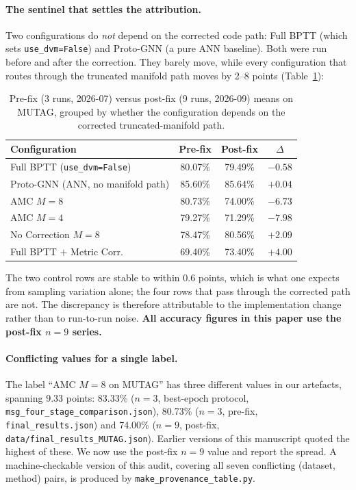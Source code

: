 \documentclass[a4paper,fleqn]{cas-dc}
\begin{document}
\paragraph{The sentinel that settles the attribution.}
Two configurations do \emph{not} depend on the corrected code path:
Full BPTT (which sets \texttt{use\_dvm=False}) and Proto-GNN (a pure ANN
baseline). Both were run before and after the correction. They barely
move, while every configuration that routes through the truncated
manifold path moves by 2--8 points (Table~\ref{tab:sentinel}):

\begin{table}[htbp]
\centering\footnotesize
\caption{Pre-fix (3 runs, 2026-07) versus post-fix (9 runs, 2026-09)
means on MUTAG, grouped by whether the configuration depends on the
corrected truncated-manifold path.}
\label{tab:sentinel}
\begin{tabular}{@{}p{3.3cm}ccc@{}}
\toprule
Configuration & Pre-fix & Post-fix & $\Delta$ \\
\midrule
Full BPTT (\texttt{use\_dvm=False}) & 80.07\% & 79.49\% & $-0.58$ \\
Proto-GNN (ANN, no manifold path) & 85.60\% & 85.64\% & $+0.04$ \\
\midrule
AMC $M{=}8$ & 80.73\% & 74.00\% & $-6.73$ \\
AMC $M{=}4$ & 79.27\% & 71.29\% & $-7.98$ \\
No Correction $M{=}8$ & 78.47\% & 80.56\% & $+2.09$ \\
Full BPTT $+$ Metric Corr. & 69.40\% & 73.40\% & $+4.00$ \\
\bottomrule
\end{tabular}
\end{table}

The two control rows are stable to within 0.6 points, which is what one
expects from sampling variation alone; the four rows that pass through
the corrected path are not. The discrepancy is therefore attributable to
the implementation change rather than to run-to-run noise. \textbf{All
accuracy figures in this paper use the post-fix $n{=}9$ series.}

\paragraph{Conflicting values for a single label.}
The label ``AMC $M{=}8$ on MUTAG'' has three different values in our
artefacts, spanning 9.33 points: 83.33\% ($n{=}3$, best-epoch protocol,
\texttt{msg\_four\_stage\_comparison.json}), 80.73\% ($n{=}3$, pre-fix,
\texttt{final\_results.json}) and 74.00\% ($n{=}9$, post-fix,
\texttt{data/final\_results\_MUTAG.json}). Earlier versions of
this manuscript quoted the highest of these. We now use the post-fix
$n{=}9$ value and report the spread. A machine-checkable version of this
audit, covering all seven conflicting (dataset, method) pairs, is
produced by \texttt{make\_provenance\_table.py}.
\end{document}
